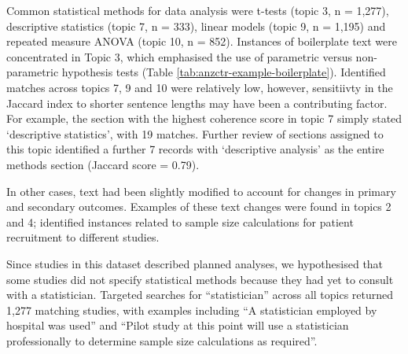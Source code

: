 \documentclass[12pt]{article}
\begin{document}
Common statistical methods for data analysis were t-tests (topic 3, n = 1,277), descriptive statistics (topic 7, n = 333), linear models (topic 9, n = 1,195) and repeated measure ANOVA (topic 10, n = 852).
Instances of boilerplate text were concentrated in Topic 3, which emphasised the use of parametric versus non-parametric hypothesis tests (Table \ref{tab:anzctr-example-boilerplate}). Identified matches across topics 7, 9 and 10 were
relatively low, however, sensitiivty in the Jaccard index to shorter sentence lengths may have been a contributing factor. For example, the section with the highest coherence score in topic 7 simply stated `descriptive statistics', with 19 matches. Further review of 
sections assigned to this topic identified a further 7 records with `descriptive analysis' as the entire methods section (Jaccard score = 0.79).

In other cases, text had been slightly modified to account for changes
in primary and secondary outcomes. Examples of these text changes were
found in topics 2 and 4; identified instances
related to sample size calculations for patient recruitment to different
studies.

Since studies in this dataset described planned analyses, we
hypothesised that some studies did not specify statistical methods because
they had yet to consult with a statistician. Targeted searches for ``statistician'' across all topics returned 1,277 matching studies,
with examples including ``A statistician employed by hospital was used''
and ``Pilot study at this point will use a statistician professionally
to determine sample size calculations as required''.
\end{document}
